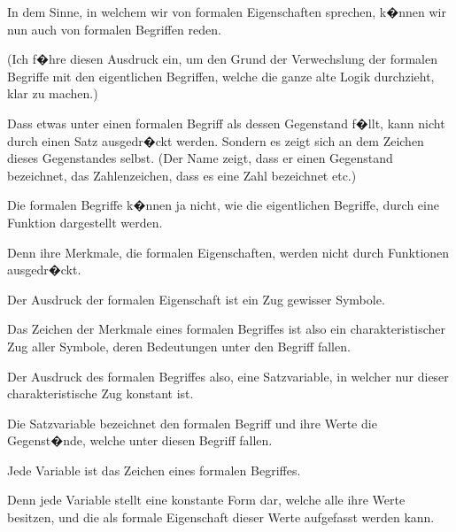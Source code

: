 {In dem Sinne, in welchem wir von formalen
Eigenschaften sprechen, k�nnen wir nun auch
von formalen Begriffen reden.

(Ich f�hre diesen Ausdruck ein, um den Grund
der Verwechslung der formalen Begriffe mit den
eigentlichen Begriffen, welche die ganze alte Logik
durchzieht, klar zu machen.)

Dass etwas unter einen formalen Begriff als
dessen Gegenstand f�llt, kann nicht durch einen
Satz ausgedr�ckt werden. Sondern es zeigt sich
an dem Zeichen dieses Gegenstandes selbst. (Der
Name zeigt, dass er einen Gegenstand bezeichnet,
das Zahlenzeichen, dass es eine Zahl bezeichnet etc.)

Die formalen Begriffe k�nnen ja nicht, wie
die eigentlichen Begriffe, durch eine Funktion
dargestellt werden.

Denn ihre Merkmale, die formalen Eigenschaften,
werden nicht durch Funktionen ausgedr�ckt.

Der Ausdruck der formalen Eigenschaft ist ein
Zug gewisser Symbole.

Das Zeichen der Merkmale eines formalen
Begriffes ist also ein charakteristischer Zug aller
Symbole, deren Bedeutungen unter den Begriff
fallen.

Der Ausdruck des formalen Begriffes also, eine
Satzvariable, in welcher nur dieser charakteristische
Zug konstant ist.}


{Die Satzvariable bezeichnet den formalen
Begriff und ihre Werte die Gegenst�nde, welche
unter diesen Begriff fallen.}


{Jede Variable ist das Zeichen eines formalen
Begriffes.

Denn jede Variable stellt eine konstante Form
dar, welche alle ihre Werte besitzen, und die als
\enlargethispage{-4pt} %
formale Eigenschaft dieser Werte aufgefasst werden
kann.}


